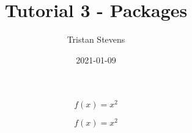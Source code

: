\documentclass{article}
\title{Tutorial 3 - Packages}
\date{2021-01-09}
\author{Tristan Stevens}
\begin{document}
	\maketitle
	\newpage

	\begin{equation}
		f(x)=x^2
	\end{equation}

	\begin{equation*}
		f(x)=x^2
	\end{equation*}
\end{document}
